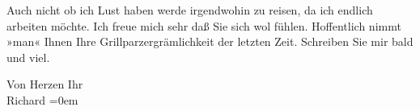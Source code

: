 \pstart
           {\pb}Auch nicht ob ich Lust haben werde
               irgendwohin zu reisen, da ich endlich arbeiten möchte. Ich freue mich sehr daß Sie
               sich wol fühlen. Hoffentlich nimmt »man« Ihnen Ihre Grillparzergrämlichkeit der letzten Zeit. Schreiben Sie mir bald und
               viel.\pend
           
\pstart
           Von Herzen Ihr{\\[\baselineskip]}\spacefill\mbox{Richard}\pend
           \leftskip=0em{}\endnumbering{}  \newcommand{\dateiname}{L01144}\newcommand{\titel}{Richard Beer-Hofmann an Arthur Schnitzler, 10. 7. 1901}\newcommand{\editorInnen}{Martin Anton Müller und Gerd-Hermann Susen}
